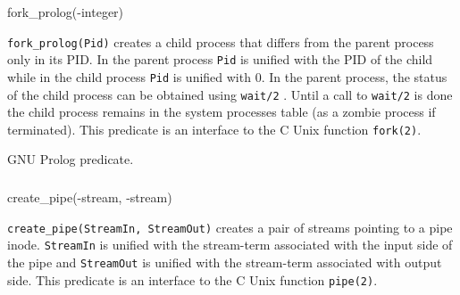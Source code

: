 \begin{TemplatesOneCol}
fork\_prolog(-integer)

\end{TemplatesOneCol}

\Description

\texttt{fork\_prolog(Pid)} creates a child process that differs from the parent
process only in its PID. In the parent process \texttt{Pid} is unified with
the PID of the child while in the child process \texttt{Pid} is unified with
0. In the parent process, the status of the child process can be obtained
using \texttt{wait/2} . Until a call to \texttt{wait/2} is done
the child process remains in the system processes table (as a zombie process
if terminated). This predicate is an interface to the C Unix function
\texttt{fork(2)}.

\begin{PlErrors}



\end{PlErrors}

\Portability

GNU Prolog predicate.

\subsubsection{}

\begin{TemplatesOneCol}
create\_pipe(-stream, -stream)

\end{TemplatesOneCol}

\Description

\texttt{create\_pipe(StreamIn, StreamOut)} creates  a  pair  of streams
pointing to a pipe inode. \texttt{StreamIn} is unified with the stream-term
associated with the input side of the pipe and \texttt{StreamOut} is unified
with the stream-term associated with output side. This predicate is an
interface to the C Unix function \texttt{pipe(2)}.

\begin{PlErrors}




\end{PlErrors}

